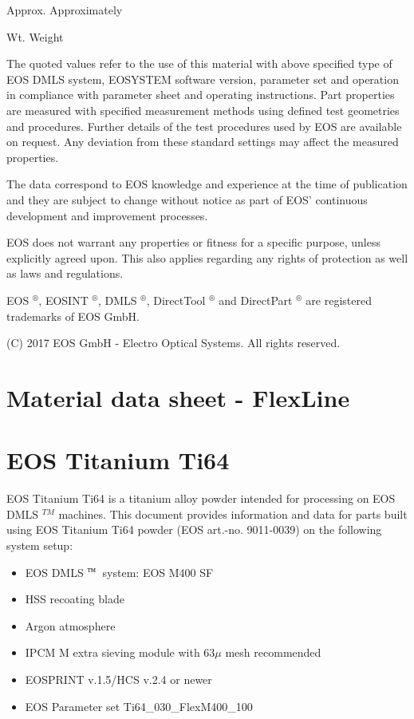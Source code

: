 \documentclass[10pt]{article}
\begin{document}
Approx. Approximately

Wt. Weight

The quoted values refer to the use of this material with above specified type of EOS DMLS system, EOSYSTEM software version, parameter set and operation in compliance with parameter sheet and operating instructions. Part properties are measured with specified measurement methods using defined test geometries and procedures. Further details of the test procedures used by EOS are available on request. Any deviation from these standard settings may affect the measured properties.

The data correspond to EOS knowledge and experience at the time of publication and they are subject to change without notice as part of EOS' continuous development and improvement processes.

EOS does not warrant any properties or fitness for a specific purpose, unless explicitly agreed upon. This also applies regarding any rights of protection as well as laws and regulations.

EOS $^{\circledR}$, EOSINT $^{\circledR}$, DMLS $^{\circledR}$, DirectTool $^{\circledR}$ and DirectPart ${ }^{\circledR}$ are registered trademarks of EOS GmbH.

(C) 2017 EOS GmbH - Electro Optical Systems. All rights reserved.

\section*{Material data sheet - FlexLine}
\section*{EOS Titanium Ti64}
EOS Titanium Ti64 is a titanium alloy powder intended for processing on EOS DMLS ${ }^{T M}$ machines. This document provides information and data for parts built using EOS Titanium Ti64 powder (EOS art.-no. 9011-0039) on the following system setup:

\begin{itemize}
  \item EOS DMLS ${ }^{\text {тм }}$ system: EOS M400 SF
  \item HSS recoating blade
  \item Argon atmosphere
  \item IPCM M extra sieving module with $63 \mu$ mesh recommended
  \item EOSPRINT v.1.5/HCS v.2.4 or newer
  \item EOS Parameter set Ti64\_030\_FlexM400\_100
\end{itemize}
\end{document}
